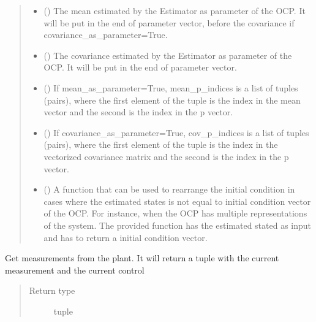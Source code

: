 \documentclass[letterpaper,10pt,english]{sphinxmanual}
\begin{document}
\begin{fulllineitems}
\begin{fulllineitems}
\begin{quote}
\begin{description}
\begin{itemize}
\item {} 
 () \textendash{} The mean estimated by the Estimator as parameter of the OCP. It will be put in
the end of parameter vector, before the covariance if covariance\_as\_parameter=True.

\item {} 
 () \textendash{} The covariance estimated by the Estimator as parameter of the OCP. It will
be put in the end of parameter vector.

\item {} 
 () \textendash{} If mean\_as\_parameter=True, mean\_p\_indices is a list of tuples (pairs), where the
first element of the tuple is the index in the mean vector and the second is the index in the p vector.

\item {} 
 () \textendash{} If covariance\_as\_parameter=True, cov\_p\_indices is a list of tuples (pairs), where the
first element of the tuple is the index in the vectorized covariance matrix and the second is the index in the p
vector.

\item {} 
 () \textendash{} A function that can be used to rearrange the initial condition in
cases where the estimated states is not equal to initial condition vector of the OCP. For instance, when the OCP
has multiple representations of the system. The provided function has the estimated stated as input and has to
return a initial condition vector.

\end{itemize}

\end{description}\end{quote}

\end{fulllineitems}


\begin{fulllineitems}
\label{\detokenize{yaocptool.mpc:yaocptool.mpc.mpc.MPC.get_measurement}}
Get measurements from the plant. It will return a tuple with the current measurement and the current control
\begin{quote}\begin{description}
\item[{Return type}] \leavevmode
tuple


\end{description}
\end{quote}
\end{fulllineitems}
\end{fulllineitems}
\end{document}
